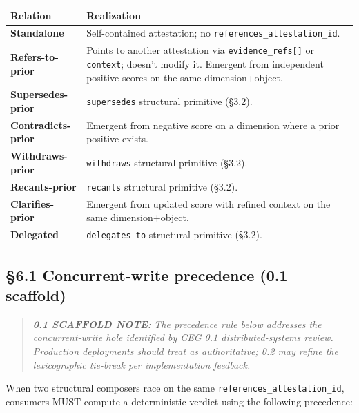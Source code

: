 \documentclass[11pt]{article}
\begin{document}
{\footnotesize
\begin{longtable}{|p{8.0cm}|p{8.0cm}|}\hline
\textbf{Relation} & \textbf{Realization} \\ \hline\endhead
\textbf{Standalone} & Self-contained attestation; no \texttt{references\_attestation\_id}. \\ \hline
\textbf{Refers-to-prior} & Points to another attestation via \texttt{evidence\_refs[]} or \texttt{context}; doesn't modify it. Emergent from independent positive scores on the same dimension+object. \\ \hline
\textbf{Supersedes-prior} & \texttt{supersedes} structural primitive (§3.2). \\ \hline
\textbf{Contradicts-prior} & Emergent from negative score on a dimension where a prior positive exists. \\ \hline
\textbf{Withdraws-prior} & \texttt{withdraws} structural primitive (§3.2). \\ \hline
\textbf{Recants-prior} & \texttt{recants} structural primitive (§3.2). \\ \hline
\textbf{Clarifies-prior} & Emergent from updated score with refined context on the same dimension+object. \\ \hline
\textbf{Delegated} & \texttt{delegates\_to} structural primitive (§3.2). \\ \hline
\end{longtable}}


\subsection*{§6.1 Concurrent-write precedence (0.1 scaffold)}


\begin{quote}\itshape \textbf{0.1 SCAFFOLD NOTE}: The precedence rule below addresses the concurrent-write hole identified by CEG 0.1 distributed-systems review. Production deployments should treat as authoritative; 0.2 may refine the lexicographic tie-break per implementation feedback.\end{quote}


When two structural composers race on the same \texttt{references\_attestation\_id}, consumers MUST compute a deterministic verdict using the following precedence:
\end{document}

